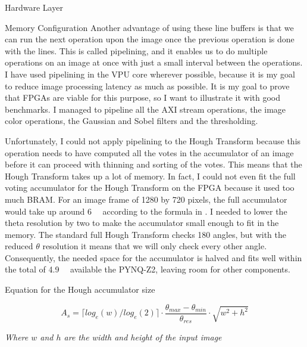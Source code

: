 \documentclass{matthijs}
\begin{document}
\begin{hoofdstuk}{Hardware Layer}
\begin{paragraaf}{Memory Configuration}
			Another advantage of using these line buffers is that we can run the next operation upon the image once the previous operation is done with the lines.
			This is called pipelining, and it enables us to do multiple operations on an image at once with just a small interval between the operations.
			I have used pipelining in the VPU core wherever possible, because it is my goal to reduce image processing latency as much as possible.
			It is my goal to prove that FPGAs are viable for this purpose, so I want to illustrate it with good benchmarks.
			I managed to pipeline all the AXI stream operations, the image color operations, the Gaussian and Sobel filters and the thresholding.
			
			\bigskip

			Unfortunately, I could not apply pipelining to the Hough Transform because this operation needs to have computed all the votes in the accumulator of an image before it can proceed with thinning and sorting of the votes.
			This means that the Hough Transform takes up a lot of memory.
			In fact, I could not even fit the full voting accumulator for the Hough Transform on the FPGA because it used too much BRAM.
			For an image frame of 1280 by 720 pixels, the full accumulator would take up around \qty{6}{\mebi\bit} according to the formula in .
			I needed to lower the theta resolution by two to make the accumulator small enough to fit in the memory.
			The standard full Hough Transform checks 180 angles, but with the reduced $\theta$ resolution it means that we will only check every other angle.
			Consequently, the needed space for the accumulator is halved and fits well within the total of \qty{4,9}{\mebi\bit} available the PYNQ-Z2, leaving room for other components.

			\begin{figuur}{Equation for the Hough accumulator size}

				\vspace{1ex}

				\begin{equation*}
					A_s = \lceil log_e(w) / log_e(2) \rceil \cdot \frac{\theta_{max} - \theta_{min}}{\theta_{res}} \cdot \sqrt{w^2 + h^2}
				\end{equation*}

				\vspace{2ex}

				\textit{Where $w$ and $h$ are the width and height of the input image}


\end{figuur}
\end{paragraaf}
\end{hoofdstuk}
\end{document}
